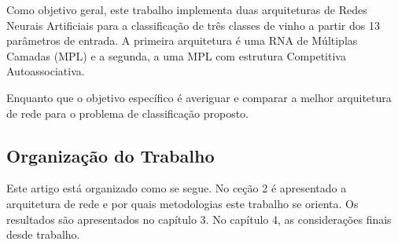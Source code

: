 Como objetivo geral, este trabalho implementa duas arquiteturas de Redes Neurais Artificiais para a classificação de três classes de vinho a partir dos 13 parâmetros de entrada. A primeira arquitetura é uma RNA de Múltiplas Camadas (MPL) e a segunda, a uma MPL com estrutura Competitiva Autoassociativa.

Enquanto que o objetivo específico é averiguar e comparar a melhor arquitetura de rede para o problema de classificação proposto.


\subsection{Organização do Trabalho}

Este artigo está organizado como se segue. No ceção 2 é apresentado a arquitetura de rede e por quais metodologias este trabalho se orienta. Os resultados são apresentados no capítulo 3. No capítulo 4, as considerações finais desde trabalho.